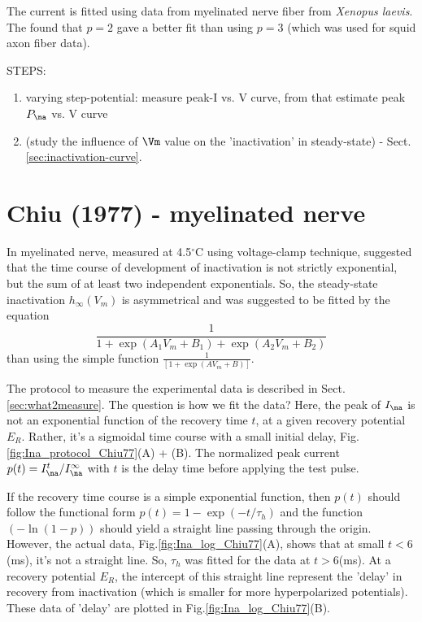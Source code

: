 The current is fitted using data from myelinated nerve fiber from {\it Xenopus
laevis}. The found that $p=2$ gave a better fit than using $p=3$ (which was used
for squid axon fiber data).

STEPS:
\begin{enumerate}
  \item varying step-potential: measure peak-I vs. V curve, from that estimate
  peak $P_\na$ vs.
  V curve
  
  \item  (study the influence of $\Vm$ value on the 'inactivation' in
  steady-state) - Sect.\ref{sec:inactivation-curve}.
\end{enumerate}

\section{Chiu (1977) - myelinated nerve}
\label{sec:Ina_Chiu1977}

In myelinated nerve, measured at 4.5$^\circ$C using
voltage-clamp technique, \citep{chiu1977} suggested that the time course of
development of inactivation is not strictly exponential, but the sum of at
least two independent exponentials. So, the steady-state inactivation
$h_\infty(V_m)$ is asymmetrical and was suggested to be fitted by the equation
\begin{equation}
\frac{1}{1+\exp(A_1 V_m+B_1)+\exp(A_2V_m+B_2)}
\end{equation}
than using the simple function $\frac{1}{\left[1+\exp(AV_m+B)\right]}$.

The protocol to measure the experimental data is described in
Sect.\ref{sec:what2measure}. The question is how we fit the data? Here, the peak
of $I_\na$ is not an exponential function of the recovery time $t$, at a given
recovery potential $E_R$. Rather, it's a sigmoidal time course with a small
initial delay, Fig.\ref{fig:Ina_protocol_Chiu77}(A) + (B).
The normalized peak current $p(t)=I^t_\na/I_\na^\infty$ with $t$ is the delay
time before applying the test pulse.  

If the recovery time course is a simple exponential function, then $p(t)$ should
follow the functional form $p(t)=1-\exp(-t/\tau_h)$ and the function
$\left(-\ln(1-p)\right)$ should yield a straight line passing through the
origin. However, the actual data, Fig.\ref{fig:Ina_log_Chiu77}(A), shows that at
small $t <6$(ms), it's not a straight line. So, $\tau_h$ was fitted for the data
at $t>6$(ms). At a recovery potential $E_R$, the intercept of this straight line
represent the 'delay' in recovery from inactivation (which is smaller for more
hyperpolarized potentials). These data of 'delay' are plotted in
Fig.\ref{fig:Ina_log_Chiu77}(B).


